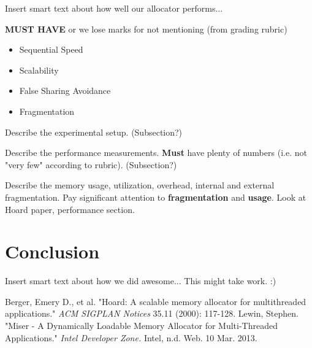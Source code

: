 \documentclass{article}
\begin{document}
Insert smart text about how well our allocator performs...

\textbf{MUST HAVE} or we lose marks for not mentioning (from grading rubric)
\begin{itemize}
	\item Sequential Speed
	\item Scalability
	\item False Sharing Avoidance
	\item Fragmentation
\end{itemize}

Describe the experimental setup. (Subsection?)

Describe the performance measurements. \textbf{Must} have plenty of numbers 
(i.e. not "very few" according to rubric). (Subsection?)

Describe the memory usage, utilization, overhead, internal and external 
fragmentation. Pay significant attention to \textbf{fragmentation} and 
\textbf{usage}. Look at Hoard paper, performance section. 

\newpage
\section{Conclusion}
\label{sec:conclusion}

Insert smart text about how we did awesome... This might take work. :)

\newpage

\begin{thebibliography}{9}
	
		Berger, Emery D., et al.
		"Hoard: A scalable memory allocator for multithreaded applications."
		\textit{ACM SIGPLAN Notices} 35.11 
		(2000): 
		117-128.
		Lewin, Stephen.
		"Miser - A Dynamically Loadable Memory Allocator for Multi-Threaded Applications."
		\textit{Intel Developer Zone.}
		Intel, 
		n.d. Web. 10 Mar. 2013.

\end{thebibliography}
\end{document}
